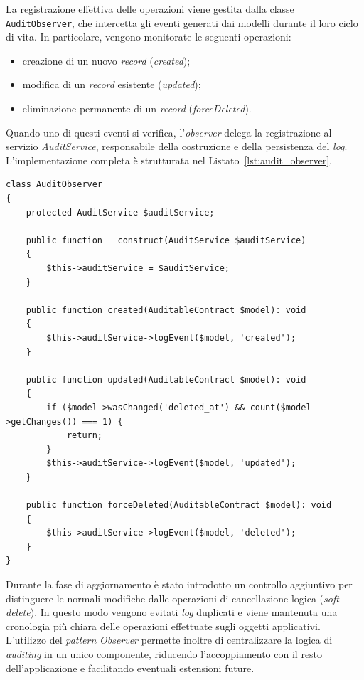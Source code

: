 La registrazione effettiva delle operazioni viene gestita dalla classe \texttt{AuditObserver}, che intercetta gli eventi generati dai modelli durante il loro ciclo di vita. In particolare, vengono monitorate le seguenti operazioni:
\begin{itemize}
	\item creazione di un nuovo \textit{record} (\textit{created});
	\item modifica di un \textit{record} esistente (\textit{updated});
	\item eliminazione permanente di un \textit{record} (\textit{forceDeleted}).
\end{itemize}
Quando uno di questi eventi si verifica, l'\textit{observer} delega la registrazione al servizio \textit{AuditService}, responsabile della costruzione e della persistenza del \textit{log}. L'implementazione completa è strutturata nel Listato~\ref{lst:audit_observer}.
\begin{lstlisting}[float=!t, caption={Classe AuditObserver per la centralizzazione degli eventi legati alla persistenza.}, captionpos=b, label={lst:audit_observer}, basicstyle=\ttfamily\footnotesize, lineskip=-1pt, breaklines=true, breakatwhitespace=true,columns=flexible,]
class AuditObserver
{
	protected AuditService $auditService;
	
	public function __construct(AuditService $auditService)
	{
		$this->auditService = $auditService;
	}
	
	public function created(AuditableContract $model): void
	{
		$this->auditService->logEvent($model, 'created');
	}
	
	public function updated(AuditableContract $model): void
	{
		if ($model->wasChanged('deleted_at') && count($model->getChanges()) === 1) {
			return;
		}
		$this->auditService->logEvent($model, 'updated');
	}
	
	public function forceDeleted(AuditableContract $model): void
	{
		$this->auditService->logEvent($model, 'deleted');
	}
}
\end{lstlisting}
Durante la fase di aggiornamento è stato introdotto un controllo aggiuntivo per distinguere le normali modifiche dalle operazioni di cancellazione logica (\textit{soft delete}). In questo modo vengono evitati \textit{log} duplicati e viene mantenuta una cronologia più chiara delle operazioni effettuate sugli oggetti applicativi. L'utilizzo del \textit{pattern} \textit{Observer} permette inoltre di centralizzare la logica di \textit{auditing} in un unico componente, riducendo l'accoppiamento con il resto dell'applicazione e facilitando eventuali estensioni future.

